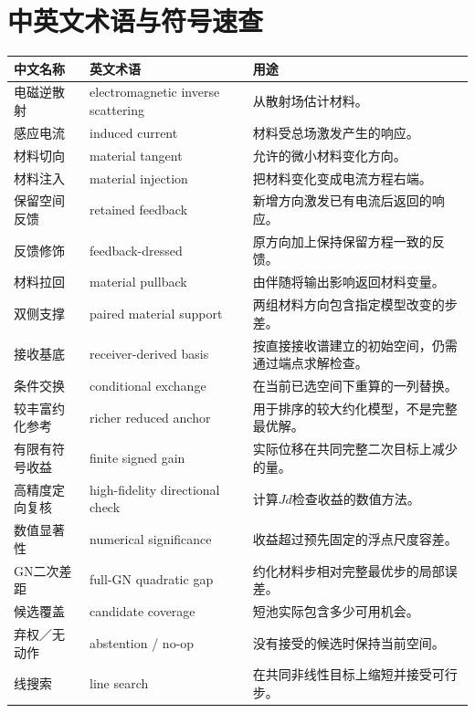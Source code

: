 \section*{中英文术语与符号速查}
\noindent\begin{tabularx}{\linewidth}{p{.23\linewidth}p{.31\linewidth}X}\toprule
中文名称&英文术语&用途\\\midrule
电磁逆散射&electromagnetic inverse scattering&从散射场估计材料。\\
感应电流&induced current&材料受总场激发产生的响应。\\
材料切向&material tangent&允许的微小材料变化方向。\\
材料注入&material injection&把材料变化变成电流方程右端。\\
保留空间反馈&retained feedback&新增方向激发已有电流后返回的响应。\\
反馈修饰&feedback-dressed&原方向加上保持保留方程一致的反馈。\\
材料拉回&material pullback&由伴随将输出影响返回材料变量。\\
双侧支撑&paired material support&两组材料方向包含指定模型改变的步差。\\
接收基底&receiver-derived basis&按直接接收谱建立的初始空间，仍需通过端点求解检查。\\
条件交换&conditional exchange&在当前已选空间下重算的一列替换。\\
较丰富约化参考&richer reduced anchor&用于排序的较大约化模型，不是完整最优解。\\
有限有符号收益&finite signed gain&实际位移在共同完整二次目标上减少的量。\\
高精度定向复核&high-fidelity directional check&计算$Jd$检查收益的数值方法。\\
数值显著性&numerical significance&收益超过预先固定的浮点尺度容差。\\
GN二次差距&full-GN quadratic gap&约化材料步相对完整最优步的局部误差。\\
候选覆盖&candidate coverage&短池实际包含多少可用机会。\\
弃权／无动作&abstention / no-op&没有接受的候选时保持当前空间。\\
线搜索&line search&在共同非线性目标上缩短并接受可行步。\\
\bottomrule\end{tabularx}

